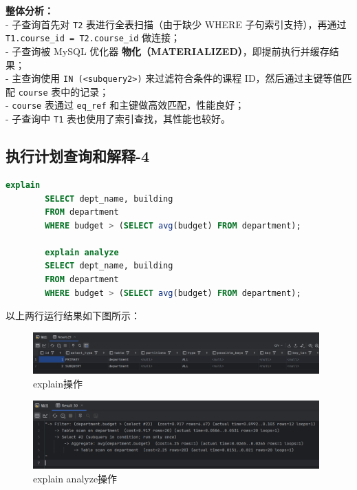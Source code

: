 \documentclass{article}
\begin{document}
	\textbf{整体分析：}  \\
	- 子查询首先对 \texttt{T2} 表进行全表扫描（由于缺少 WHERE 子句索引支持），再通过 \texttt{T1.course\_id = T2.course\_id} 做连接；\\
	- 子查询被 MySQL 优化器 \textbf{物化（MATERIALIZED）}，即提前执行并缓存结果；\\
	- 主查询使用 \texttt{IN (<subquery2>)} 来过滤符合条件的课程 ID，然后通过主键等值匹配 \texttt{course} 表中的记录；\\
	- \texttt{course} 表通过 \texttt{eq\_ref} 和主键做高效匹配，性能良好；\\
	- 子查询中 \texttt{T1} 表也使用了索引查找，其性能也较好。\\
	
	\subsection{执行计划查询和解释-4}
	
	\begin{lstlisting}[language=sql, title=执行以下语句，获取并解释该查询执行计划, tabsize=4]
		explain
		SELECT dept_name, building
		FROM department
		WHERE budget > (SELECT avg(budget) FROM department);
		
		explain analyze
		SELECT dept_name, building
		FROM department
		WHERE budget > (SELECT avg(budget) FROM department);
	\end{lstlisting}
	
	以上两行运行结果如下图所示：
	
	\begin{figure}[H]
		\centering
		\includegraphics[width=11cm]{./images/10.解释操作1.png}
		\caption{explain操作}
	\end{figure}
	
	\begin{figure}[H]
		\centering
		\includegraphics[width=11cm]{./images/11.解释操作2.png}
		\caption{explain analyze操作}
	\end{figure}
	
\end{document}
